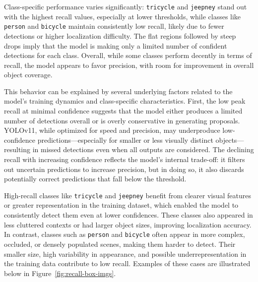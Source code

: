 Class-specific performance varies significantly: \texttt{tricycle} and \texttt{jeepney} stand out with the highest recall values, especially at lower thresholds, while classes like \texttt{person} and \texttt{bicycle} maintain consistently low recall, likely due to fewer detections or higher localization difficulty. The flat regions followed by steep drops imply that the model is making only a limited number of confident detections for each class. Overall, while some classes perform decently in terms of recall, the model appears to favor precision, with room for improvement in overall object coverage.

This behavior can be explained by several underlying factors related to the model's training dynamics and class-specific characteristics. First, the low peak recall at minimal confidence suggests that the model either produces a limited number of detections overall or is overly conservative in generating proposals. YOLOv11, while optimized for speed and precision, may underproduce low-confidence predictions—especially for smaller or less visually distinct objects—resulting in missed detections even when all outputs are considered. The declining recall with increasing confidence reflects the model's internal trade-off: it filters out uncertain predictions to increase precision, but in doing so, it also discards potentially correct predictions that fall below the threshold.

High-recall classes like \texttt{tricycle} and \texttt{jeepney} benefit from clearer visual features or greater representation in the training dataset, which enabled the model to consistently detect them even at lower confidences. These classes also appeared in less cluttered contexts or had larger object sizes, improving localization accuracy. In contrast, classes such as \texttt{person} and \texttt{bicycle} often appear in more complex, occluded, or densely populated scenes, making them harder to detect. Their smaller size, high variability in appearance, and possible underrepresentation in the training data contribute to low recall. Examples of these cases are illustrated below in Figure~\ref{fig:recall-box-imgs}.

